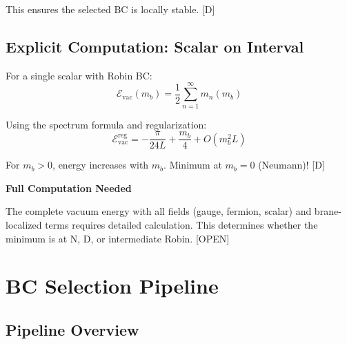 \documentclass[11pt,a4paper]{article}
\newcommand{\tagD}{\textcolor{blue!70!black}{[D]}}
\newcommand{\tagOPEN}{\textcolor{red!70!black}{[OPEN]}}
\begin{document}
This ensures the selected BC is locally stable. \tagD

\subsection{Explicit Computation: Scalar on Interval}

For a single scalar with Robin BC:
\begin{equation}
\label{eq:scalar-vac}
\mathcal{E}_{\text{vac}}(m_b) = \frac{1}{2} \sum_{n=1}^{\infty} m_n(m_b)
\end{equation}

Using the spectrum formula and regularization:
\begin{equation}
\label{eq:scalar-vac-reg}
\mathcal{E}_{\text{vac}}^{\text{reg}} = -\frac{\pi}{24L} + \frac{m_b}{4} + O(m_b^2 L)
\end{equation}

For $m_b > 0$, energy increases with $m_b$. Minimum at $m_b = 0$ (Neumann)! \tagD

\begin{openbox}
\textbf{Full Computation Needed}

The complete vacuum energy with all fields (gauge, fermion, scalar) and
brane-localized terms requires detailed calculation. This determines
whether the minimum is at N, D, or intermediate Robin. \tagOPEN
\end{openbox}

\section{BC Selection Pipeline}

\subsection{Pipeline Overview}
\end{document}
